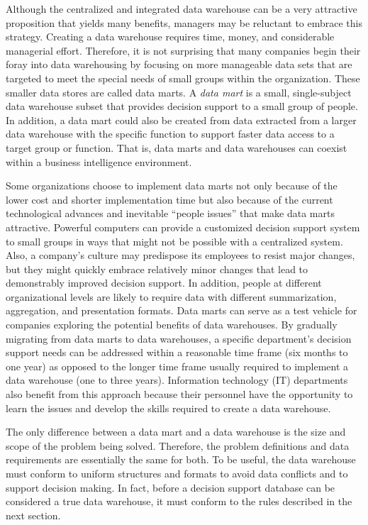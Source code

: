 \documentclass{vldb}
\begin{document}
Although the centralized and integrated data warehouse can be a very attractive proposition that yields many benefits,
managers may be reluctant to embrace this strategy. Creating a data warehouse requires time, money, and
considerable managerial effort. Therefore, it is not surprising that many companies begin their foray into data
warehousing by focusing on more manageable data sets that are targeted to meet the special needs of small groups
within the organization. These smaller data stores are called data marts. A \textit{data mart} is a small, single-subject data
warehouse subset that provides decision support to a small group of people. In addition, a data mart could also be
created from data extracted from a larger data warehouse with the specific function to support faster data access to
a target group or function. That is, data marts and data warehouses can coexist within a business intelligence
environment.

Some organizations choose to implement data marts not only because of the lower cost and shorter implementation
time but also because of the current technological advances and inevitable “people issues” that make data marts
attractive. Powerful computers can provide a customized decision support system to small groups in ways that might
not be possible with a centralized system. Also, a company’s culture may predispose its employees to resist major
changes, but they might quickly embrace relatively minor changes that lead to demonstrably improved decision
support. In addition, people at different organizational levels are likely to require data with different summarization,
aggregation, and presentation formats. Data marts can serve as a test vehicle for companies exploring the potential
benefits of data warehouses. By gradually migrating from data marts to data warehouses, a specific department’s
decision support needs can be addressed within a reasonable time frame (six months to one year) as opposed to the
longer time frame usually required to implement a data warehouse (one to three years). Information technology (IT)
departments also benefit from this approach because their personnel have the opportunity to learn the issues and
develop the skills required to create a data warehouse.

The only difference between a data mart and a data warehouse is the size and scope of the problem being solved.
Therefore, the problem definitions and data requirements are essentially the same for both. To be useful, the data
warehouse must conform to uniform structures and formats to avoid data conflicts and to support decision making. 
In fact, before a decision support database can be considered a true data warehouse, it must conform to the rules
described in the next section.
\end{document}
